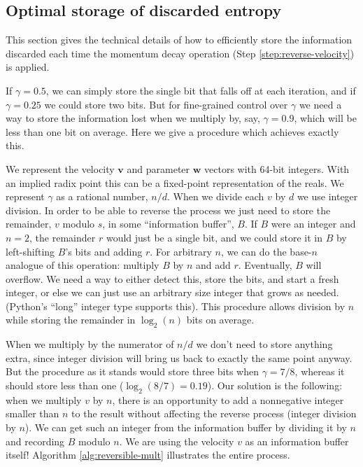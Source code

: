\documentclass{article}
\newcommand{\vw}{\mathbf{w}}
\newcommand{\vv}{\mathbf{v}}
\newcommand{\params}{\vw}
\newcommand{\decay}{\gamma}
\begin{document}
\subsection{Optimal storage of discarded entropy}
\label{sec:reversible computation}

This section gives the technical details of how to efficiently store the information discarded each time the momentum decay
operation (Step \ref{step:reverse-velocity}) is applied.

If $\decay = 0.5$, we can simply store the
single bit that falls off at each iteration, and if $\decay = 0.25$ we could
store two bits. But for fine-grained control over $\decay$ we need a way to store the information lost when we multiply by, say, $\decay = 0.9$, which will be less than one bit on average. Here we give a procedure which achieves exactly
this.

We represent the velocity $\vv$ and parameter $\params$ vectors with 64-bit integers. With an implied radix point this can be a fixed-point
representation of the reals. We represent $\decay$ as a rational number,
$n/d$. When we divide each $v$ by $d$ we use integer division. In order to be able to
reverse the process we just need to store the remainder, $v$ modulo $s$, in some
``information buffer'', $B$. If $B$ were an integer and $n = 2$, the remainder $r$ would just be a single bit, and we could store it in $B$ by left-shifting $B$'s bits and adding $r$. For arbitrary $n$, we can do the base-$n$ analogue of this operation: multiply $B$ by $n$ and add $r$.
Eventually, $B$ will overflow. We need a way to either detect
this, store the bits, and start a fresh integer, or else we can just use an
arbitrary size integer that grows as needed. (Python's ``long'' integer type
supports this). This procedure allows division by $n$ while storing the
remainder in $\log_2(n)$ bits on average.

When we multiply by the numerator of $n/d$ we don't need to store anything
extra, since integer division will bring us back to exactly the same point
anyway. But the procedure as it stands would store three bits when $\decay = 7/8$,
whereas it should store less than one ($\log_2 (8/7) = 0.19$). Our solution is the following: when we multiply $v$ by $n$, there is an opportunity to add a
nonnegative integer smaller than $n$ to the result without affecting the reverse
process (integer division by $n$). We can get such an integer from the
information buffer by dividing it by $n$ and recording $B$ modulo $n$. We are using
the velocity $v$ as an information buffer itself! Algorithm
\ref{alg:reversible-mult} illustrates the entire process.
\end{document}

